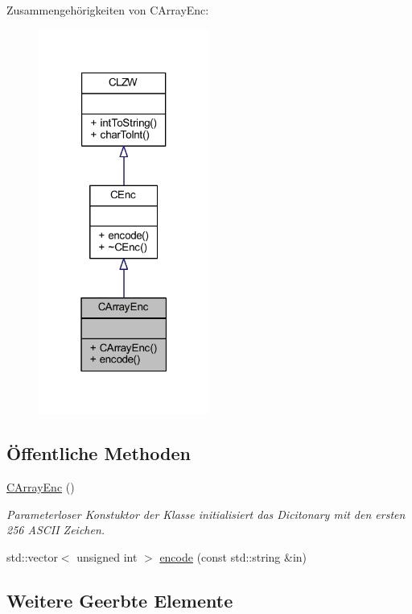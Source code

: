 Zusammengehörigkeiten von C\+Array\+Enc\+:
\nopagebreak
\begin{figure}[H]
\begin{center}
\leavevmode
\includegraphics[width=159pt]{class_c_array_enc__coll__graph}
\end{center}
\end{figure}
\subsection*{Öffentliche Methoden}
\begin{DoxyCompactItemize}
\item 
\hyperlink{class_c_array_enc_ad583bca8c7872d055f6118219f657970}{C\+Array\+Enc} ()
\begin{DoxyCompactList}\small\item\em Parameterloser Konstuktor der Klasse initialisiert das Dicitonary mit den ersten 256 A\+S\+C\+II Zeichen. \end{DoxyCompactList}\item 
std\+::vector$<$ unsigned int $>$ \hyperlink{class_c_array_enc_a51984cee678c54c93caf73aa82b596cc}{encode} (const std\+::string \&in)
\end{DoxyCompactItemize}
\subsection*{Weitere Geerbte Elemente}


